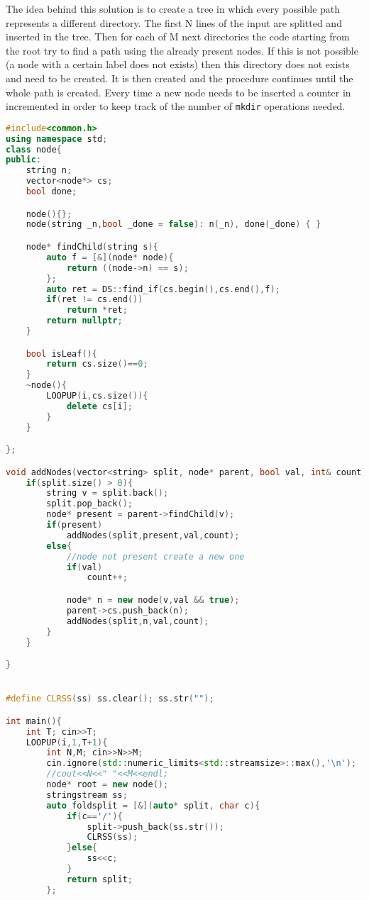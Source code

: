 \begin{solution}
	The idea behind this solution is to create a tree in which every possible path represents a different directory. The first N lines of the input are splitted and inserted in the tree. Then for each of M next  directories the code starting from the root try to find a path using the already present nodes. If this is not possible (a node with a certain label does not exists) then this directory does not exists and need to be created. It is then created and the procedure continues until the whole path is created. Every time a new node needs to be inserted a counter in incremented in order to keep track of the number of \texttt{mkdir} operations needed.
	
	\begin{lstlisting}[language=c++, caption="File fix it c++ solution"]
#include<common.h>
using namespace std;
class node{
public:
    string n;
    vector<node*> cs;
    bool done;

    node(){};
    node(string _n,bool _done = false): n(_n), done(_done) { }

    node* findChild(string s){
        auto f = [&](node* node){
            return ((node->n) == s);
        };
        auto ret = DS::find_if(cs.begin(),cs.end(),f);
        if(ret != cs.end())
            return *ret;
        return nullptr;
    }

    bool isLeaf(){
        return cs.size()==0;
    }
    ~node(){
        LOOPUP(i,cs.size()){
            delete cs[i];
        }
    }

};

void addNodes(vector<string> split, node* parent, bool val, int& count){
    if(split.size() > 0){
        string v = split.back();
        split.pop_back();
        node* present = parent->findChild(v);
        if(present)
            addNodes(split,present,val,count);
        else{
            //node not present create a new one
            if(val)
                count++;            

            node* n = new node(v,val && true);
            parent->cs.push_back(n);
            addNodes(split,n,val,count);
        }
    }

}


#define CLRSS(ss) ss.clear(); ss.str("");

int main(){
    int T; cin>>T;
    LOOPUP(i,1,T+1){
        int N,M; cin>>N>>M;
        cin.ignore(std::numeric_limits<std::streamsize>::max(),'\n');
        //cout<<N<<" "<<M<<endl;
        node* root = new node();
        stringstream ss;
        auto foldsplit = [&](auto* split, char c){
            if(c=='/'){
                split->push_back(ss.str());
                CLRSS(ss);
            }else{
                ss<<c;
            }
            return split;
        };


\end{lstlisting}
\end{solution}
